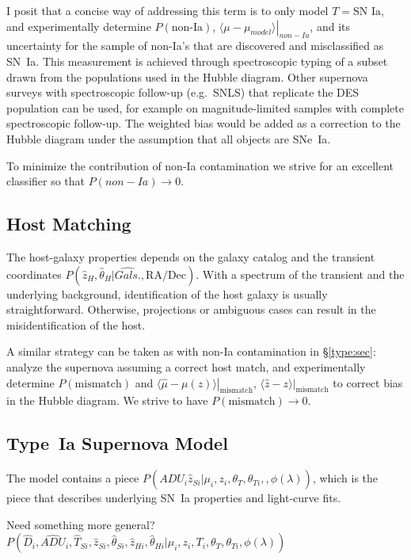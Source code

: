 \documentclass[preprint]{aastex}
\begin{document}
I posit that a concise way of addressing this term is to only model $T=\text{SN~Ia}$,
and experimentally determine $P(\text{non-Ia})$, 
$\left. \langle \mu-\mu_{model} \rangle \right|_{non-Ia}$, and its uncertainty for the
sample of non-Ia's that are discovered and misclassified as SN~Ia.
This measurement is achieved through spectroscopic
typing of a subset drawn from the populations used in the Hubble diagram.
Other supernova surveys
with spectroscopic follow-up (e.g.\ SNLS) that replicate the DES population
can be used, for example on magnitude-limited samples with
complete  spectroscopic follow-up. 
The weighted bias would be added as a correction to the Hubble diagram under the assumption that all objects are SNe~Ia.

To minimize the contribution of non-Ia contamination we strive for
an excellent classifier so that $P(non-Ia) \rightarrow 0$.


\subsection{Host Matching}
\sloppy
The host-galaxy properties depends on the galaxy catalog and the transient
coordinates $P(\hat{z}_H, \hat{\theta}_H | \hat{\mathit{Gals.}}, \text{RA/Dec})$.  With a
spectrum of the transient and the underlying background, identification of the host galaxy
is usually straightforward.
Otherwise, projections or ambiguous cases can result in the misidentification of
the host.

A similar strategy can be taken as with non-Ia contamination in \S\ref{type:sec}:
analyze the supernova assuming a correct host match, and
experimentally determine $P(\text{mismatch} )$ and
$\left. \langle \hat{\mu}-\mu(z)\rangle \right|_{\text{mismatch}}$, $\left. \langle \hat{z}-z \rangle \right|_{\text{mismatch}}$ to correct bias in the Hubble diagram. 
We strive to have $P(\text{mismatch}) \rightarrow 0$.


\subsection{Type~Ia Supernova Model}
\label{snmodel:sec}
The model contains a piece $P(\hat{\mathit{ADU}}_{i} \hat{z}_{Si}| \mu_i,z_i,\theta_T, \theta_{Ti}, ,\phi(\lambda))$, which
is the piece that describes underlying SN~Ia properties and light-curve fits.

Need something more general?
$P(\hat{D}_i,\hat{\mathit{ADU}}_{i}, \hat{T}_{Si}, \hat{z}_{Si}, \hat{\theta}_{Si}, \hat{z}_{Hi}, \hat{\theta}_{Hi}
 | \mu_i,z_i,T_i,\theta_T,\theta_{Ti},\phi(\lambda))$
\end{document}
